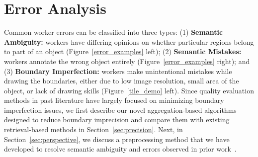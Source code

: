 \section{Error Analysis}
\par Common worker errors can be classified into three types: (1) \textbf{Semantic Ambiguity:} workers have differing opinions on whether particular regions belong to part of an object (Figure~\ref{error_examples} left); (2) \textbf{Semantic Mistakes:} workers annotate the wrong object entirely (Figure~\ref{error_examples} right); and (3) \textbf{Boundary Imperfection:} workers make unintentional mistakes while drawing the boundaries, either due to low image resolution, small area of the object, or lack of drawing skills (Figure~\ref{tile_demo} left).
Since quality evaluation methods in past literature have largely focused on minimizing boundary imperfection issues, we first describe our novel aggregation-based algorithms designed to reduce boundary imprecision and compare them with existing retrieval-based methods in Section~\ref{sec:precision}.%
Next, in Section~\ref{sec:perspective}, we discuss a preprocessing method that we have developed to resolve semantic ambiguity and errors observed in prior work~\cite{Sorokin2008,Lin2014,Gurari2018}. 
